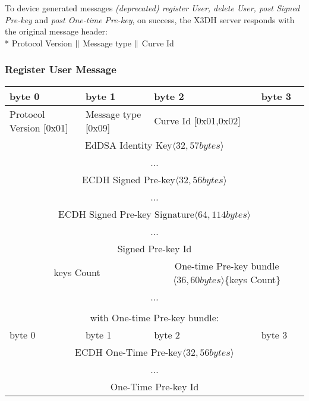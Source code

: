 \documentclass[a4paper,11pt]{article}
\begin{document}
    To device generated messages \textit{(deprecated) register User, delete User, post Signed Pre-key} and \textit{post One-time Pre-key}, on success, the X3DH server responds with the original message header:\\*
    Protocol Version $\Arrowvert $ Message type $\Arrowvert $ Curve Id
    \subsubsection{Register User Message}
      \begin{center}
      \begin{tabular}{ | p{1.4in} | p{1.4in} | p{1.4in} | p{1.4in} |}
        \hline
        \cellcolor[gray]{0.85} byte 0 & \cellcolor[gray]{0.85} byte 1 & \cellcolor[gray]{0.85} byte 2 & \cellcolor[gray]{0.85}byte 3\\
        \hline
        Protocol Version [0x01] & Message type [0x09] & Curve Id [0x01,0x02] &\\
        \cline{1-3}
        \multicolumn{4}{|c|}{EdDSA Identity Key$\langle 32,57bytes\rangle $}\\
        \multicolumn{4}{|c|}{...}\\
        \hline
        \multicolumn{4}{|c|}{ECDH Signed Pre-key$\langle 32,56bytes\rangle $}\\
        \multicolumn{4}{|c|}{...}\\
        \hline
        \multicolumn{4}{|c|}{ECDH Signed Pre-key Signature$\langle 64,114bytes\rangle $}\\
        \multicolumn{4}{|c|}{...}\\
        \hline
        \multicolumn{4}{|c|}{Signed Pre-key Id}\\
        \hline
        \multicolumn{2}{|c}{keys Count} & \multicolumn{2}{|c|}{One-time Pre-key bundle$\langle 36,60bytes\rangle $\{keys Count\}}\\
        \cline{1-2}
        \multicolumn{4}{|c|}{...}\\
        \hline
        \multicolumn{4}{c}{}\\
        \multicolumn{4}{c}{with One-time Pre-key bundle:}\\
        \hline
        \cellcolor[gray]{0.95} byte 0 & \cellcolor[gray]{0.95} byte 1 & \cellcolor[gray]{0.95} byte 2 & \cellcolor[gray]{0.95}byte 3\\
        \hline
        \multicolumn{4}{|c|}{ECDH One-Time Pre-key$\langle 32,56bytes\rangle$}\\
        \multicolumn{4}{|c|}{...}\\
        \hline
        \multicolumn{4}{|c|}{One-Time Pre-key Id}\\
        \hline
      \end{tabular}
      \end{center}
    
\end{document}
